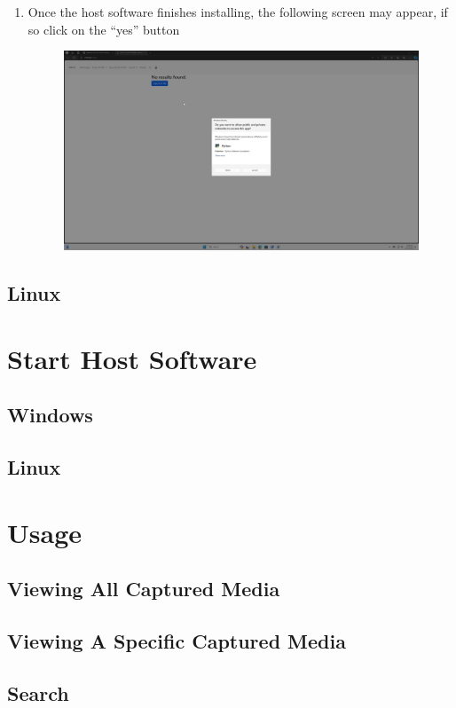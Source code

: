 \documentclass[12pt]{article}
\begin{document}
\begin{center}
\begin{enumerate}
\begin{figure}[H]
		      \end{figure}
		\item Once the host software finishes installing, the following screen may appear, if so click on the ``yes'' button
		      \begin{figure}[H]
			      \includegraphics[width=\textwidth]{Figures/Windows-Allow-Python.png}
		      \end{figure}
	\end{enumerate}
	\subsection{Linux}
	\section{Start Host Software}
	\subsection{Windows}
	\subsection{Linux}
	\section{Usage}
	\subsection{Viewing All Captured Media}
	\subsection{Viewing A Specific Captured Media}
	\subsection{Search}

\end{center}
\end{document}
